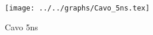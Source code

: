 \begin{figure}[h] \centering \texttt{[image: ../../graphs/Cavo\_5ns.tex]}\caption{Cavo 5ns}\label{gr:Cavo_5ns} \end{figure}
